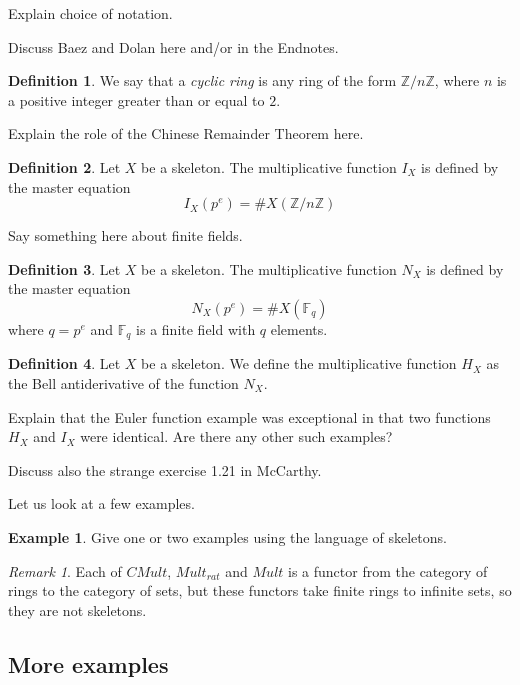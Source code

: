 \documentclass[a4paper]{article}
\theoremstyle{definition}
\newtheorem{definition}{Definition}[section]
\newtheorem{example}{Example}[section]
\theoremstyle{remark}
\newtheorem*{remark}{Remark}
\newcommand{\Z}{\mathbb{Z}}
\newcommand{\Fq}{\mathbb{F}_q}
\begin{document}
Explain choice of notation.

Discuss Baez and Dolan \cite{} here and/or in the Endnotes.


\begin{definition}
We say that a \emph{cyclic ring} is any ring of the form $\Z / n \Z$, where $n$ is a positive integer greater than or equal to $2$. 
\end{definition}

Explain the role of the Chinese Remainder Theorem here.

\begin{definition}
Let $X$ be a skeleton. The multiplicative function $I_X$ is defined by the master equation
$$  I_X(p^e) = \# X( \Z / n \Z  )  $$

\end{definition}

Say something here about finite fields.

\begin{definition}
Let $X$ be a skeleton. The multiplicative function $N_X$ is defined by the master equation
$$  N_X(p^e) = \# X( \Fq )  $$
where $q= p^e$ and $\Fq$ is a finite field with $q$ elements. 
\end{definition}

\begin{definition}
Let $X$ be a skeleton. We define the multiplicative function $H_X$ as the Bell antiderivative of the function $N_X$.

\end{definition}

Explain that the Euler function example was exceptional in that two functions $H_X$ and $I_X$ were identical. Are there any other such examples? 

Discuss also the strange exercise 1.21 in McCarthy.

Let us look at a few examples.

\begin{example}
Give one or two examples using the language of skeletons.

\end{example}

\begin{remark}
Each of $CMult$, $Mult_{rat}$ and $Mult$ is a functor from the category of rings to the category of sets, but these functors take finite rings to infinite sets, so they are not skeletons.
\end{remark}


\subsection{More examples}
\end{document}
